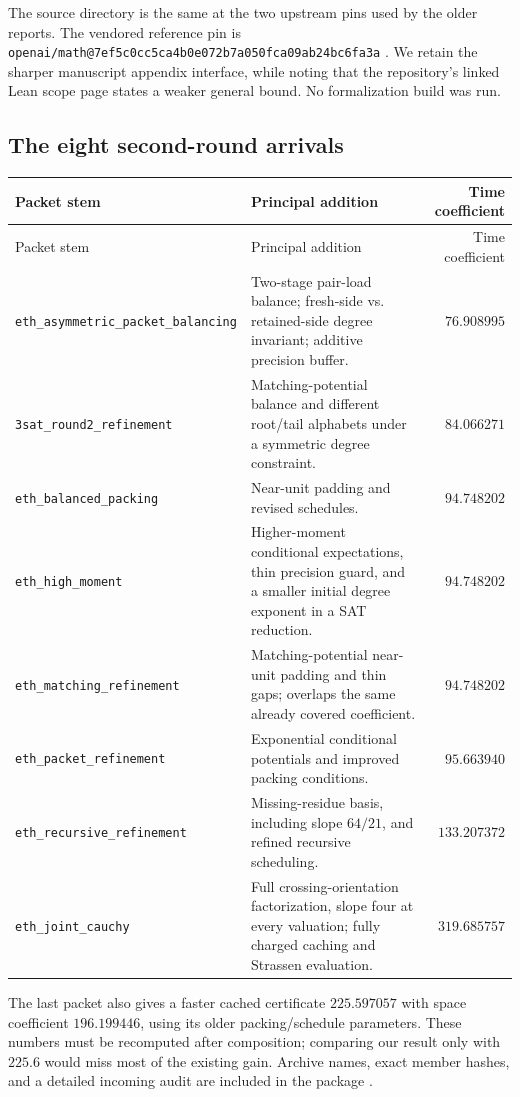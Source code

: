 \documentclass[11pt,letterpaper]{article}
\theoremstyle{definition}\newtheorem{definition}[theorem]{Definition}
\theoremstyle{remark}\newtheorem{remark}[theorem]{Remark}
\begin{document}
The source directory is the same at the two upstream pins used by the older reports.
The vendored reference pin is
\nolinkurl{openai/math@7ef5c0cc5ca4b0e072b7a050fca09ab24bc6fa3a} \cite{upstream}.
We retain the sharper manuscript appendix interface, while noting that the repository's
linked Lean scope page states a weaker general bound. No formalization build was run.

\subsection{The eight second-round arrivals}
\small
\begin{longtable}{@{}p{}p{}r@{}}
\toprule
Packet stem & Principal addition & Time coefficient\\
\midrule\endfirsthead
\toprule Packet stem & Principal addition & Time coefficient\\\midrule\endhead
\nolinkurl{eth_asymmetric_packet_balancing} & Two-stage pair-load balance; fresh-side
vs. retained-side degree invariant; additive precision buffer. & $76.908995$\\[4pt]
\nolinkurl{3sat_round2_refinement} & Matching-potential balance and different root/tail
alphabets under a symmetric degree constraint. & $84.066271$\\[4pt]
\nolinkurl{eth_balanced_packing} & Near-unit padding and revised schedules. & $94.748202$\\[4pt]
\nolinkurl{eth_high_moment} & Higher-moment conditional expectations, thin precision
guard, and a smaller initial degree exponent in a SAT reduction. & $94.748202$\\[4pt]
\nolinkurl{eth_matching_refinement} & Matching-potential near-unit padding and thin
gaps; overlaps the same already covered coefficient. & $94.748202$\\[4pt]
\nolinkurl{eth_packet_refinement} & Exponential conditional potentials and improved
packing conditions. & $95.663940$\\[4pt]
\nolinkurl{eth_recursive_refinement} & Missing-residue basis, including slope $64/21$,
and refined recursive scheduling. & $133.207372$\\[4pt]
\nolinkurl{eth_joint_cauchy} & Full crossing-orientation factorization, slope four at every
valuation; fully charged caching and Strassen evaluation. & $319.685757$\\
\bottomrule
\end{longtable}
\normalsize
The last packet also gives a faster cached certificate $225.597057$ with space
coefficient $196.199446$, using its older packing/schedule parameters. These numbers
must be recomputed after composition; comparing our result only with $225.6$ would
miss most of the existing gain. Archive names, exact member hashes, and a detailed
incoming audit are included in the package \cite{incoming}.
\end{document}
